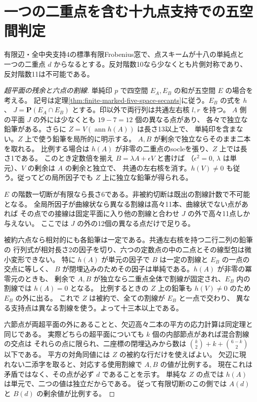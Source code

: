 \section{一つの二重点を含む十九点支持での五空間判定}
\label{sec:finite-one-double-five-space}
\begin{theorem}\label{thm:finite-one-double-five-space}
有限辺・全中央支持4の標準有限Frobenius窓で、点スキームが十八の単純点と
一つの二重点 $d$ からなるとする。反対階数10なら少なくとも片側対称であり、
反対階数11は不可能である。
\end{theorem}
\begin{proof}[超平面の残余と六点の割線]
単純印 $p$ で四空間 $E_A,E_B$ の和が五空間 $E$ の場合を考える。
記号は定理\ref{thm:finite-marked-five-space-secants}に従う。$E_B$ の式を $h$、
$J=\mathbf P(E_A\cap E_B)$ とする。印以外で両行列は共通左右核 $l,r$ を持つ。
$A$ 側の平面 $J$ の外には少なくとも $19-7=12$ 個の異なる点があり、
各々で独立な鉛筆がある。さらに $Z=V(\operatorname{ann}h(A))$ は長さ13以上で、
単純印を含まない。$Z$ 上で使う鉛筆を局所的に明示する。
$A,B$ が剰余で独立ならそのまま二本を取れる。
比例する場合は $h(A)$ が非零の二重点のsocleを張り、$Z$ 上では長さ1である。
このとき定数倍を揃え $B=\lambda A+\epsilon V$ と書けば
（$\epsilon^2=0$, $\lambda$ は単元）、$V$ の剰余は $A$ の剰余と独立で、
共通の左右核を消す。$h(V)\ne0$ も従う。従ってどの局所因子でも $Z$ 上に独立な鉛筆が得られる。

$E$ の階数一切断が有限なら長さ6である。非被約切断は既出の割線計数で不可能となる。
全局所因子が曲線状なら異なる割線は高々11本、曲線状でない点があれば
その点での接線は固定平面に入り他の割線と合わせ $J$ の外で高々11点しか与えない。
ここでは $J$ の外の12個の異なる点だけで足りる。

被約六点なら相対的にも各鉛筆は一定である。共通左右核を持つ二行二列の鉛筆の
行列式が相対長さ2の因子を切り、六つの定数点の中の二点とその線型包は微小変形できない。
特に $h(A)$ が単元の因子で $B$ は一定の割線と $E_B$ の一点の交点に等しく、
$B$ が閉埋込みのためその因子は単純である。$h(A)$ が非零の冪零元のときも、
剰余で $A,B$ が独立なら二重点全体で割線が固定され、$E_B$ 内の割線では $h(A)=0$ となる。
比例するときの $Z$ 上の鉛筆も $h(V)\ne0$ のため $E_B$ の外に出る。
これで $Z$ は被約で、全ての割線が $E_B$ と一点で交わり、
異なる支持点は異なる割線を使う。よって十三本以上である。

六節点が両超平面の外にあることと、欠辺高々二本の平方の応力計算は同定理と同じである。
実際どちらの超平面についても $k$ 個の内部節点があれば混合割線の交点は
それらの点に限られ、二座標の閉埋込みから数は $\binom{k}{2}+k+\binom{6-k}{2}$ 以下である。
平方の対角同値には $Z$ の被約な行だけを使えばよい。
欠辺に現れない二添字を取ると、対応する使用割線で $A,B$ の値が比例する。
現在これは矛盾ではなく、その点が必ず $d$ であることを示す。
単純な $Z$ の点では $h(A)$ は単元で、二つの値は独立だからである。
従って有限切断のこの側では $A(d)$ と $B(d)$ の剰余値が比例する。
\end{proof}
